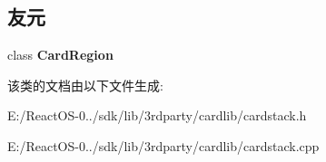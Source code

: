 \subsection*{友元}
\begin{DoxyCompactItemize}
\item 
\mbox{\label{class_card_stack_a4c254036246a74e6cf000397ce876c4f}} 
class {\bfseries Card\+Region}
\end{DoxyCompactItemize}


该类的文档由以下文件生成\+:\begin{DoxyCompactItemize}
\item 
E\+:/\+React\+O\+S-\/0../sdk/lib/3rdparty/cardlib/cardstack.\+h\item 
E\+:/\+React\+O\+S-\/0../sdk/lib/3rdparty/cardlib/cardstack.\+cpp\end{DoxyCompactItemize}
